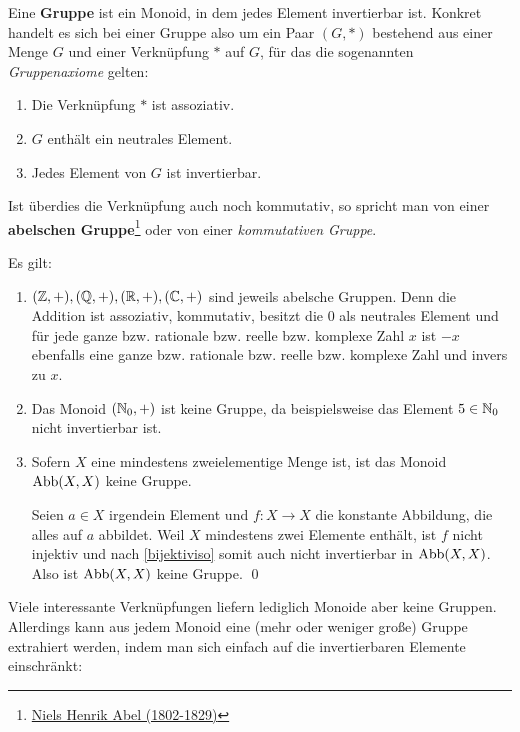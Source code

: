 \begin{de}[Gruppe]  
    Eine \textbf{Gruppe} ist ein Monoid, in dem jedes Element invertierbar ist. Konkret handelt es sich bei einer Gruppe also um ein Paar $(G,*)$ bestehend aus einer Menge $G$ und einer Verknüpfung $*$ auf $G$, für das die sogenannten \emph{Gruppenaxiome} gelten:
    \begin{enumerate}[(G1), labelindent=1.5em, leftmargin=*]
        \item Die Verknüpfung $*$ ist assoziativ.
        \item $G$ enthält ein neutrales Element.
        \item Jedes Element von $G$ ist invertierbar.
    \end{enumerate}
    Ist überdies die Verknüpfung auch noch kommutativ, so spricht man von einer \textbf{abelschen Gruppe}\footnote{\href{https://de.wikipedia.org/wiki/Niels_Henrik_Abel}{Niels Henrik Abel (1802-1829)}} oder von einer \emph{kommutativen Gruppe}.
\end{de}


\begin{bsp}
    Es gilt:
    \begin{enumerate}
        \item $(\mathbb Z,+),(\mathbb Q,+),(\mathbb R,+),(\mathbb C,+)$ sind jeweils abelsche Gruppen. Denn die Addition ist assoziativ, kommutativ, besitzt die $0$ als neutrales Element und für jede ganze bzw. rationale bzw. reelle bzw. komplexe Zahl $x$ ist $-x$ ebenfalls eine ganze bzw. rationale bzw. reelle bzw. komplexe Zahl und invers zu $x$.
        \item Das Monoid $(\mathbb N_0,+)$ ist keine Gruppe, da beispielsweise das Element $5\in \mathbb N_0$ nicht invertierbar ist.
        \item Sofern $X$ eine mindestens zweielementige Menge ist, ist das Monoid $\operatorname{Abb}(X,X)$ keine Gruppe.
        \begin{bew}[(*)]
            Seien $a\in X$ irgendein Element und $f:X\to X$ die konstante Abbildung, die alles auf $a$ abbildet. Weil $X$ mindestens zwei Elemente enthält, ist $f$ nicht injektiv und nach \cref{bijektiviso} somit auch nicht invertierbar in $\operatorname{Abb}(X,X)$. Also ist $\operatorname{Abb}(X,X)$ keine Gruppe. \qed
        \end{bew}
    \end{enumerate}
\end{bsp}


\noindent Viele interessante Verknüpfungen liefern lediglich Monoide aber keine Gruppen. Allerdings kann aus jedem Monoid eine (mehr oder weniger große) Gruppe extrahiert werden, indem man sich einfach auf die invertierbaren Elemente einschränkt:


